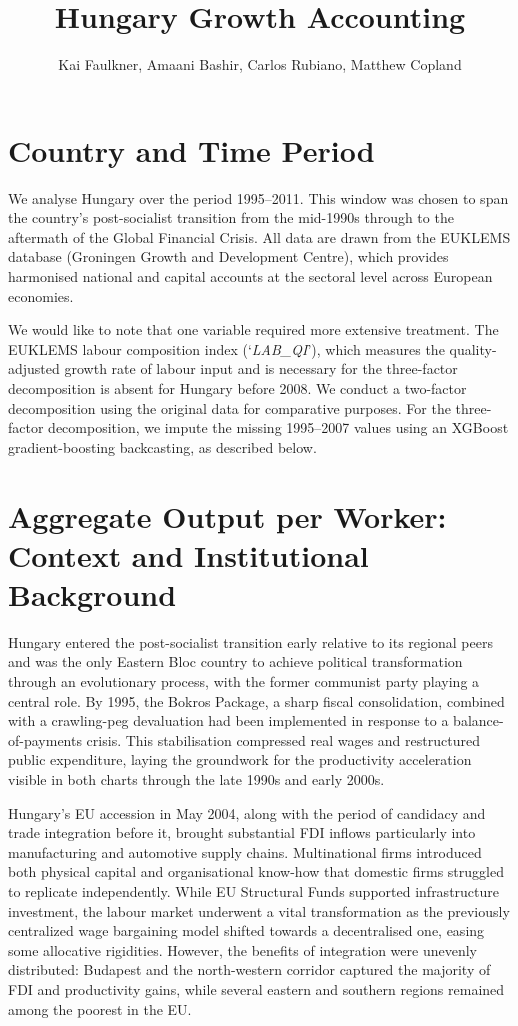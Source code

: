 \documentclass[11pt]{article}
\title{Hungary Growth Accounting}
\author{Kai Faulkner, Amaani Bashir, Carlos Rubiano, Matthew Copland}
\date{}
\begin{document}
\maketitle

\section{Country and Time Period}

We analyse Hungary over the period 1995–2011. This window was chosen to span the country’s post-socialist transition from the mid-1990s through to the aftermath of the Global Financial Crisis. All data are drawn from the EUKLEMS database (Groningen Growth and Development Centre), which provides harmonised national and capital accounts at the sectoral level across European economies.

We would like to note that one variable required more extensive treatment. The EUKLEMS labour composition index (‘\textit{LAB\_QI}’), which measures the quality-adjusted growth rate of labour input and is necessary for the three-factor decomposition is absent for Hungary before 2008. We conduct a two-factor decomposition using the original data for comparative purposes. For the three-factor decomposition, we impute the missing 1995–2007 values using an XGBoost gradient-boosting backcasting, as described below.

\section{Aggregate Output per Worker: Context and Institutional Background}

Hungary entered the post-socialist transition early relative to its regional peers and was the only Eastern Bloc country to achieve political transformation through an evolutionary process, with the former communist party playing a central role. By 1995, the Bokros Package, a sharp fiscal consolidation, combined with a crawling-peg devaluation had been implemented in response to a balance-of-payments crisis. This stabilisation compressed real wages and restructured public expenditure, laying the groundwork for the productivity acceleration visible in both charts through the late 1990s and early 2000s.

Hungary’s EU accession in May 2004, along with the period of candidacy and trade integration before it, brought substantial FDI inflows particularly into manufacturing and automotive supply chains. Multinational firms introduced both physical capital and organisational know-how that domestic firms struggled to replicate independently. While EU Structural Funds supported infrastructure investment, the labour market underwent a vital transformation as the previously centralized wage bargaining model shifted towards a decentralised one, easing some allocative rigidities. However, the benefits of integration were unevenly distributed: Budapest and the north-western corridor captured the majority of FDI and productivity gains, while several eastern and southern regions remained among the poorest in the EU.
\end{document}
